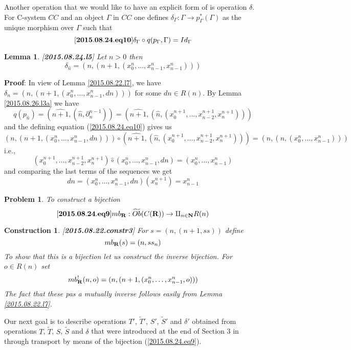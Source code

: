 \documentclass[11pt]{article}
\newenvironment{eq}{\begin{equation}}{\end{equation}}
\newenvironment{proof}{{\bf Proof}:}{\vskip 5mm }
\newtheorem{lemma}[proposition]{Lemma}
\newtheorem{problem}[proposition]{Problem}
\newtheorem{construction}[proposition]{Construction}
\newcommand{\llabel}[1]{\label{#1}[{\bf #1}]}
\newcommand{\sr}{\rightarrow}
\newcommand{\nn}{{\bf N\rm}}
\newcommand{\nat}{\nn}
\newcommand{\rr}{{\bf R}}
\newcommand{\wt}{\widetilde}
\newcommand{\wh}{\widehat}
\newcommand{\hc}{\wh{\circ}}
\begin{document}
%
Another operation that we would like to have an explicit form of is operation $\delta$. For C-system $CC$ and an object $\Gamma$ in $CC$ one defines $\delta_{\Gamma}:\Gamma\sr p_{\Gamma}^*(\Gamma)$ as the unique morphism over $\Gamma$ such that 
%
\begin{eq}\llabel{2015.08.24.eq10}
\delta_{\Gamma}\circ q(p_{\Gamma},\Gamma)=Id_{\Gamma}
\end{eq}
%
\begin{lemma}\llabel{2015.08.24.l5}
Let $n>0$ then 
%
$$\delta_{\wh{n}}=(n,(n+1,(x_0^{n},\dots,x_{n-1}^{n},x_{n-1}^n)))$$
%
\end{lemma}
%
\begin{proof}
In view of Lemma \ref{2015.08.22.l7}, we have $\delta_n=(n,(n+1,(x_0^{n},\dots,x_{n-1}^{n},dn)))$ for some $dn\in R(n)$. By Lemma \ref{2015.08.26.l3a} we have
%
$$q(p_{\wh{n}})=(\wh{n+1},(\wh{n},\partial^{n-1}_{n}))=(\wh{n+1},(\wh{n}, (x_0^{n+1},\dots,x_{n-2}^{n+1},x_n^{n+1})))$$
%
and the defining equation (\ref{2015.08.24.eq10}) gives us
%
$$(n,(n+1,(x_0^{n},\dots,x_{n-1}^{n},dn)))\circ (\wh{n+1},(\wh{n}, (x_0^{n+1},\dots,x_{n-2}^{n+1},x_n^{n+1})))=(n,(n,(x_0^n,\dots,x_{n-1}^n)))$$
%
i.e.,
%
$$(x_0^{n+1},\dots,x_{n-2}^{n+1},x_n^{n+1})\hc (x_0^{n},\dots,x_{n-1}^{n},dn) =(x_0^n,\dots,x_{n-1}^n)$$
%
and comparing the last terms of the sequences we get
%
$$dn=(x_0^{n},\dots,x_{n-1}^{n},dn)(x_n^{n+1})=x_{n-1}^n$$
%
\end{proof}














%
\begin{problem}
To construct a bijection
%
\begin{eq}\llabel{2015.08.24.eq9}
mb_{\rr}:\wt{Ob}(C(\rr))\sr \amalg_{n\in\nat} R(n)
\end{eq}
%
\end{problem}
%
\begin{construction}\rm
\llabel{2015.08.22.constr3}
For $s=(n,(n+1,ss))$ define
%
$$mb_{\rr}(s)=(n,ss_n)$$
%
To show that this is a bijection let us construct the inverse bijection. For $o\in R(n)$ set
%
$$mb_{\rr}^!(n,o)=(n,(n+1,(x_0^n,\dots,x_{n-1}^n,o)))$$
%
The fact that these pas a mutually inverse follows easily from Lemma \ref{2015.08.22.l7}.
\end{construction}
%

Our next goal is to describe operations $T'$, $\wt{T}'$, $S'$, $\wt{S}'$ and $\delta'$ obtained from operations $T$, $\wt{T}$, $S$, $\wt{S}$ and $\delta$ that were introduced at the end of Section 3 in \cite{Csubsystems} through transport by means of the bijection (\ref{2015.08.24.eq9}).
\end{document}
